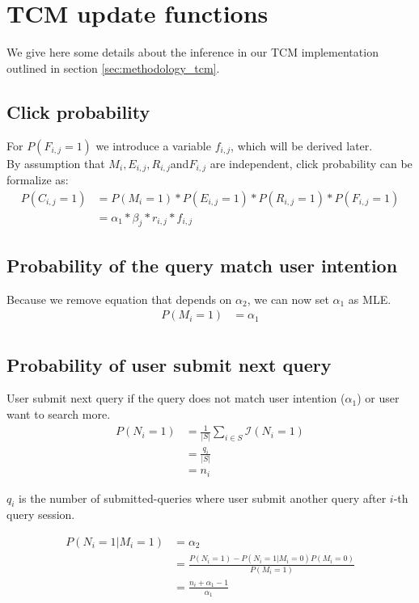 \section{TCM update functions}
\label{app:tcm_eq}
We give here some details about the inference in our TCM implementation outlined in section \ref{sec:methodology_tcm}.

\subsection{Click probability}
For $P(F_{i,j}=1)$ we introduce a variable $f_{i,j}$, which will be derived later. \\
By assumption that $M_i, E_{i,j},R_{i,j}$and$F_{i,j}$ are independent, click probability can be formalize as:
\begin{align}
P(C_{i,j} = 1)
&= P(M_i=1) * P(E_{i,j}=1) * P(R_{i,j}=1) * P(F_{i,j} = 1) \nonumber\\
&= \alpha_1 * \beta_j * r_{i,j} * f_{i,j}
\label{eq:proba_click}
\end{align}

\subsection{Probability of the query match user intention}
Because we remove equation that depends on $\alpha_2$, we can now set $\alpha_1$ as MLE.
\begin{align*}
P(M_i = 1) 
&= \alpha_1 \\
\end{align*}

\subsection{Probability of user submit next query}
User submit next query if the query does not match user intention ($\alpha_1$) or user want to search more.
\begin{align*}
P(N_i=1) 
&= \frac{1}{|S|} \sum_{i\in S} \mathcal{I}(N_i=1) \\
&= \frac{q_i}{|S|} \\
&= n_i
\end{align*}

$q_i$ is the number of submitted-queries where user submit another query after $i$-th query session.

\begin{align*}
P(N_i=1|M_i=1) 
&= \alpha_2 \\
&= \frac{P(N_i=1) - P(N_i=1|M_i=0)P(M_i=0)}{P(M_i=1)} \\
&= \frac{n_i + \alpha_1 - 1}{\alpha_1}
\end{align*}


